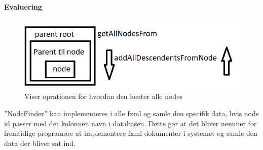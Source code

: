 \textbf{Evaluering } \\
\begin{figure} [htb!]
	\includegraphics[scale = 0.7]{./PNG/imp/nodes.PNG} 
	\caption{Viser oprationen for hvordan den henter alle nodes}
	\label{fig:nodes}
\end{figure}
”NodeFinder” kan implementeres i alle fxml og samle den specifik data, hvis node id passer med det kolonnen navn i databasen. Dette gør at det bliver nemmer for fremtidige programøre at implementere fxml dokumenter i systemet og samle den data der bliver sat ind.

